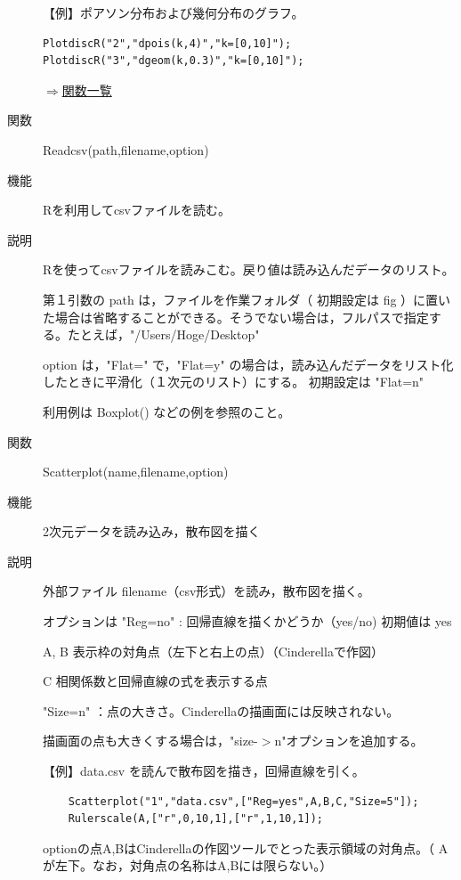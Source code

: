 \documentclass[papersize,a4paper,12pt,uplatex]{jsarticle}
\begin{document}
\begin{description}
【例】ポアソン分布および幾何分布のグラフ。
\begin{verbatim}
PlotdiscR("2","dpois(k,4)","k=[0,10]");
PlotdiscR("3","dgeom(k,0.3)","k=[0,10]");
\end{verbatim}
\begin{flushright}  \hyperlink{functionlist}{$\Rightarrow$関数一覧}\end{flushright}

\hypertarget{readcsv}{}
\item[関数]  Readcsv(path,filename,option)
\item[機能]  Rを利用してcsvファイルを読む。
\item[説明]  Rを使ってcsvファイルを読みこむ。戻り値は読み込んだデータのリスト。

第１引数の path は，ファイルを作業フォルダ（ 初期設定は fig ）に置いた場合は省略することができる。そうでない場合は，フルパスで指定する。たとえば，"/Users/Hoge/Desktop"

option は，"Flat=" で，"Flat=y" の場合は，読み込んだデータをリスト化したときに平滑化（１次元のリスト）にする。 初期設定は "Flat=n"

利用例は Boxplot() などの例を参照のこと。

\vspace{\baselineskip}
\hypertarget{scatterplot}{}
\item[関数]  Scatterplot(name,filename,option)
\item[機能]  2次元データを読み込み，散布図を描く
\item[説明]  外部ファイル filename（csv形式）を読み，散布図を描く。

オプションは  "Reg=no" : 回帰直線を描くかどうか（yes/no) 初期値は yes

                A, B  表示枠の対角点（左下と右上の点）（Cinderellaで作図）
                
                C    相関係数と回帰直線の式を表示する点
                
              "Size=n"  ：点の大きさ。Cinderellaの描画面には反映されない。
              
                      描画面の点も大きくする場合は，"size-$>$n"オプションを追加する。
                      
\vspace{\baselineskip}
【例】data.csv を読んで散布図を描き，回帰直線を引く。
\begin{verbatim}
    Scatterplot("1","data.csv",["Reg=yes",A,B,C,"Size=5"]);
    Rulerscale(A,["r",0,10,1],["r",1,10,1]);
\end{verbatim}
  optionの点A,BはCinderellaの作図ツールでとった表示領域の対角点。（ Aが左下。なお，対角点の名称はA,Bには限らない。）
  

\end{description}
\end{document}
